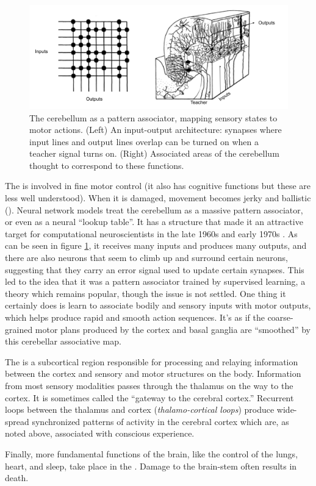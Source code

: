 \begin{figure}[h]
\centering
\includegraphics[scale=.3]{./images/cerebellum_Associator.png}
\caption[From lecture slides by David Touretsky.]{The cerebellum as a pattern associator, mapping sensory states to motor actions. (Left) An input-output architecture: synapses where input lines and output lines overlap can be turned on when a teacher signal turns on. (Right) Associated areas of the cerebellum thought to correspond to these functions.}
\label{cerebellum_associator}
\end{figure}

The  is involved in fine motor control (it also has cognitive functions but these are less well understood). When it is damaged, movement becomes jerky and ballistic (). Neural network models treat the cerebellum as a massive pattern associator, or even as a neural ``lookup table''. It has a structure that made it an attractive target for computational neuroscientists in the late 1960s and early 1970s \cite{marr1991theory}. As can be seen in figure \ref{cerebellum_associator}, it receives many inputs and produces many outputs, and there are also neurons that seem to climb up and surround certain neurons, suggesting that they carry an error signal used to update certain synapses. This led to the idea that it was a pattern associator trained by supervised learning, a theory which remains popular, though the issue is not settled. One thing it certainly does is learn to associate bodily and sensory inputs with motor outputs, which helps produce rapid and smooth action sequences. It's as if the coarse-grained motor plans produced by the cortex and basal ganglia are ``smoothed'' by this cerebellar associative map.

The  is a subcortical region responsible for  processing and relaying information between the cortex and  sensory and motor structures on the body. Information from most  sensory modalities passes through the thalamus on the way to the cortex. It is sometimes called the ``gateway to the cerebral cortex.''  Recurrent loops between the thalamus and cortex (\emph{thalamo-cortical loops}) produce wide-spread synchronized patterns of activity in the cerebral cortex which are, as noted above, associated with conscious experience.

Finally, more fundamental functions of the brain, like the control of the lungs, heart, and sleep, take place in the . Damage to the brain-stem often results in death.

